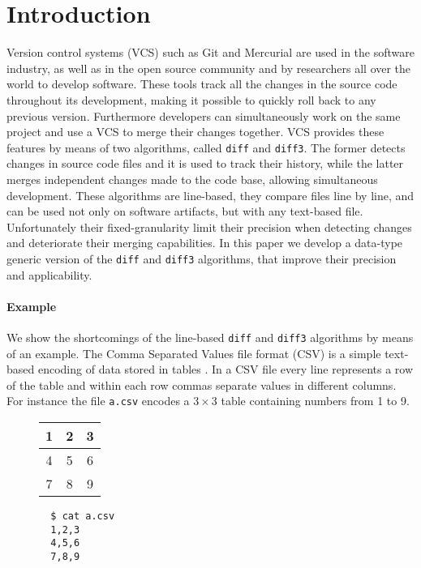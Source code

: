 \documentclass[preprint]{sigplanconf}
\begin{document}
\section{Introduction}
Version control systems (VCS) such as Git \cite{Git} and Mercurial \cite{Mercurial}
are used in the software industry, as well as in the open source community and by researchers all over the world to develop software.
These tools track all the changes in the source code throughout its development, making it possible to quickly roll back to any previous version. Furthermore developers can simultaneously work on the same project and use a VCS to merge their changes together.
VCS provides these features by means of two algorithms, called \texttt{diff} and \texttt{diff3}.
The former detects changes in source code files and it is used to track their history, while the latter merges independent changes made to the code base, allowing simultaneous development.
These algorithms are line-based, they compare files line by line, and can be used not only on software artifacts, but with any text-based file. 
Unfortunately their fixed-granularity limit their precision when detecting changes and deteriorate their merging capabilities. In this paper we develop a data-type generic version of the \texttt{diff} and \texttt{diff3} algorithms, that improve their precision and applicability.

\paragraph{Example}
We show the shortcomings of the line-based \texttt{diff} and \texttt{diff3} algorithms by means of an example.
The Comma Separated Values file format (CSV) is a simple text-based encoding of data stored in tables \cite{csv}.
In a CSV file every line represents a row of the table and within each row commas separate values in different columns.
For instance the file \texttt{a.csv} encodes a $3 \times 3$ table containing numbers from 1 to 9.
\begin{figure}[!h]
\centering
\begin{minipage}{.25\textwidth}
  \centering
  \begin{tabular}{ | c | c | c | }
    \hline
    1 & 2 & 3 \\ \hline
    4 & 5 & 6 \\ \hline
    7 & 8 & 9  \\ \hline
  \end{tabular}
\end{minipage}%
\begin{minipage}{.25\textwidth}
  \centering
  \begin{verbatim}
  $ cat a.csv
  1,2,3
  4,5,6
  7,8,9
  \end{verbatim}
\end{minipage}%
\end{figure}
\end{document}
